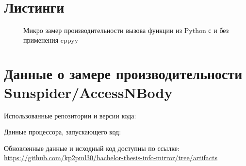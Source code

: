\documentclass[times
]{itmo-student-thesis}
\begin{document}
\printmainbibliography
\appendix

\chapter{Листинги}
\begin{figure}[!h]
	\caption{Микро замер производительности вызова функции из Python с и без применения cppyy}\label{apx:cppyy-bench}
	
\end{figure}

\chapter{Данные о замере производительности Sunspider/AccessNBody}\label{ap:sunspider}
Использованные репозитории и версии кода:


Данные процессора, запускающего код:


Обновленные данные и исходный код доступны по ссылке: \url{https://github.com/kp2pml30/bachelor-thesis-info-mirror/tree/artifacts}
\end{document}
